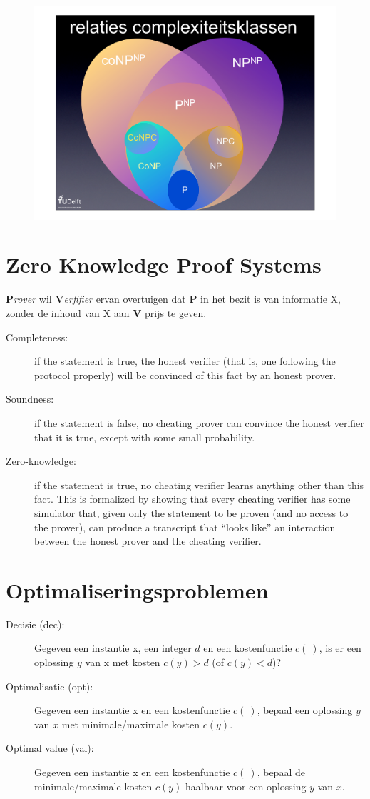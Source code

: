 \documentclass[]{article}
\begin{document}
\begin{figure}[H]
\centering
\includegraphics[width=0.6\columnwidth]{slides/orakel-klassen}
\end{figure}

\section*{Zero Knowledge Proof Systems}

\textbf{P}\textit{rover} wil \textbf{V}\textit{erfifier} ervan overtuigen dat \textbf{P} in het bezit is van informatie X, zonder de inhoud van X aan \textbf{V} prijs te geven.

\begin{description}
\item[Completeness:] if the statement is true, the honest verifier (that is, one following the protocol properly) will be convinced of this fact by an honest prover.
\item[Soundness:] if the statement is false, no cheating prover can convince the honest verifier that it is true, except with some small probability.
\item[Zero-knowledge:] if the statement is true, no cheating verifier learns anything other than this fact. This is formalized by showing that every cheating verifier has some simulator that, given only the statement to be proven (and no access to the prover), can produce a transcript that ``looks like'' an interaction between the honest prover and the cheating verifier.
\end{description}

\section*{Optimaliseringsproblemen}

\begin{description}
\item[Decisie (dec):] Gegeven een instantie x, een integer $d$ en een kostenfunctie $c(~)$, is er een oplossing $y$ van x met kosten $c(y) > d$ (of $c(y) < d$)?
\item[Optimalisatie (opt):] Gegeven een instantie x en een kostenfunctie $c(~)$, bepaal een oplossing $y$ van $x$ met minimale/maximale kosten $c(y)$.
\item[Optimal value (val):] Gegeven een instantie x en een kostenfunctie $c(~)$, bepaal de minimale/maximale kosten $c(y)$ haalbaar voor een oplossing $y$ van $x$.
\end{description}
\end{document}
